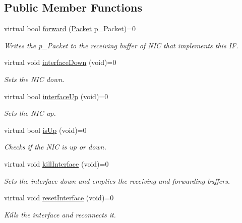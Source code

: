 \subsection*{Public Member Functions}
\begin{DoxyCompactItemize}
\item 
virtual bool \hyperlink{classInterface__If_ac646e14d69d69c1e91e7054c649ad571}{forward} (\hyperlink{classPacket}{Packet} p\-\_\-\-Packet)=0
\begin{DoxyCompactList}\small\item\em Writes the p\-\_\-\-Packet to the receiving buffer of N\-I\-C that implements this I\-F. \end{DoxyCompactList}\item 
\hypertarget{classInterface__If_a9c7bc36e9daf6597ee108d398e63b990}{virtual void \hyperlink{classInterface__If_a9c7bc36e9daf6597ee108d398e63b990}{interface\-Down} (void)=0}\label{classInterface__If_a9c7bc36e9daf6597ee108d398e63b990}

\begin{DoxyCompactList}\small\item\em Sets the N\-I\-C down. \end{DoxyCompactList}\item 
\hypertarget{classInterface__If_aa371c5e16c68e8cedcfcc7aef9dcd308}{virtual bool \hyperlink{classInterface__If_aa371c5e16c68e8cedcfcc7aef9dcd308}{interface\-Up} (void)=0}\label{classInterface__If_aa371c5e16c68e8cedcfcc7aef9dcd308}

\begin{DoxyCompactList}\small\item\em Sets the N\-I\-C up. \end{DoxyCompactList}\item 
virtual bool \hyperlink{classInterface__If_a0a289537769bd38e98e45ff6bd8f510a}{is\-Up} (void)=0
\begin{DoxyCompactList}\small\item\em Checks if the N\-I\-C is up or down. \end{DoxyCompactList}\item 
\hypertarget{classInterface__If_affd4f6a8757c1e6ce94eea6307e81b17}{virtual void \hyperlink{classInterface__If_affd4f6a8757c1e6ce94eea6307e81b17}{kill\-Interface} (void)=0}\label{classInterface__If_affd4f6a8757c1e6ce94eea6307e81b17}

\begin{DoxyCompactList}\small\item\em Sets the interface down and empties the receiving and forwarding buffers. \end{DoxyCompactList}\item 
\hypertarget{classInterface__If_af97df01939e55f731963d2f82529af39}{virtual void \hyperlink{classInterface__If_af97df01939e55f731963d2f82529af39}{reset\-Interface} (void)=0}\label{classInterface__If_af97df01939e55f731963d2f82529af39}

\begin{DoxyCompactList}\small\item\em Kills the interface and reconnects it. \end{DoxyCompactList}\end{DoxyCompactItemize}


